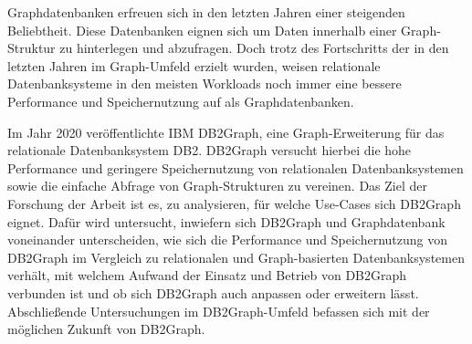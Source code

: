 Graphdatenbanken erfreuen sich in den letzten Jahren einer steigenden Beliebtheit. Diese Datenbanken eignen sich um Daten innerhalb einer Graph-Struktur zu hinterlegen und abzufragen. Doch trotz des Fortschritts der in den letzten Jahren im Graph-Umfeld erzielt wurden, weisen relationale Datenbanksysteme in den meisten Workloads noch immer eine bessere Performance und Speichernutzung auf als Graphdatenbanken.

Im Jahr 2020 veröffentlichte IBM DB2Graph, eine Graph-Erweiterung für das relationale Datenbanksystem DB2. DB2Graph versucht hierbei die hohe Performance und geringere Speichernutzung von relationalen Datenbanksystemen sowie die einfache Abfrage von Graph-Strukturen zu vereinen. Das Ziel der Forschung der Arbeit ist es, zu analysieren, für welche Use-Cases sich DB2Graph eignet. Dafür wird untersucht, inwiefern sich DB2Graph und Graphdatenbank voneinander unterscheiden, wie sich die Performance und Speichernutzung von DB2Graph im Vergleich zu relationalen und Graph-basierten Datenbanksystemen verhält, mit welchem Aufwand der Einsatz und Betrieb von DB2Graph verbunden ist und ob sich DB2Graph auch anpassen oder erweitern lässt. Abschließende  Untersuchungen im DB2Graph-Umfeld befassen sich mit der möglichen Zukunft von DB2Graph.